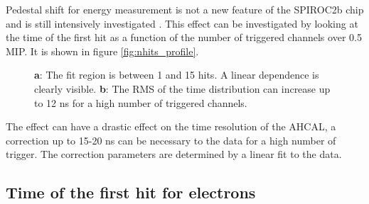 \documentclass[twoside,a4paper,11pt]{article}
\begin{document}
Pedestal shift for energy measurement is not a new feature of the SPIROC2b chip and is still intensively investigated \cite{OskarMaster}.  This effect can be investigated by looking at the time of the first hit as a function of the number of triggered channels over 0.5 MIP. It is shown in figure \ref{fig:nhits_profile}.
\begin{figure}[htbp]
	\hfill
	\caption[]{\textbf{a}: The fit region is between 1 and 15 hits. A linear dependence is clearly visible. \textbf{b}: The RMS of the time distribution can increase up to 12 ns for a high number of triggered channels.}
\end{figure}
The effect can have a drastic effect on the time resolution of the AHCAL, a correction up to 15-20 ns can be necessary to the data for a high number of trigger. The correction parameters are determined by a linear fit to the data.

\subsection{Time of the first hit for electrons}
\label{subsec:Electron_Final}
\end{document}
